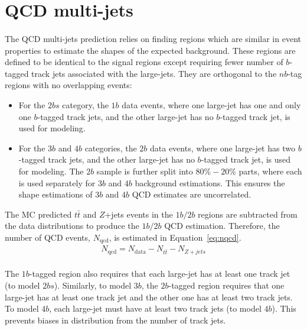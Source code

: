 \section{QCD multi-jets}
\label{sec:boosted-qcd}

\paragraph{}
The QCD multi-jets prediction relies on finding regions which are similar in event properties to estimate the shapes of the expected background.
These regions are defined to be identical to the signal regions except requiring fewer number of $b$-tagged track jets associated with the large-\R jets.
They are orthogonal to the $nb$-tag regions with no overlapping events:
\begin{itemize}
\item For the $2bs$ category, the $1b$ data events, where one large-\R jet has one and only one $b$-tagged track jets, and the other large-\R jet has no $b$-tagged track jet, is used for modeling.
\item For the $3b$ and $4b$ categories, the $2b$ data events, where one large-\R jet has two $b$-tagged track jets, and the other large-\R jet has no $b$-tagged track jet, is used for modeling. The $2b$ sample is further split into $80\%-20\%$ parts, where each is used separately for $3b$ and $4b$ background estimations. This ensures the shape estimations of $3b$ and $4b$ QCD estimates are uncorrelated. 
\end{itemize}
The MC predicted $t\bar{t}$ and $Z$+jets events in the $1b/2b$ regions are subtracted from the data distributions to produce the $1b/2b$ QCD estimation. Therefore, the number of QCD events, $N_{\text{qcd}}$, is estimated in Equation~\ref{eq:nqcd}.
\begin{eqnarray}
\label{eq:nqcd}
N_{\text{qcd}} = N_{\text{data}} - N_{t\bar{t}} - N_{Z+jets} 
\end{eqnarray}

\paragraph{}
The $1b$-tagged region also requires that each large-\R jet has at least one track jet (to model $2bs$).
Similarly, to model $3b$, the $2b$-tagged region requires that one large-\R jet has at least one track jet and the other one has at least two track jets. 
To model $4b$, each large-\R jet must have at least two track jets (to model $4b$).
This prevents biases in \mtwoJ distribution from the number of track jets.

